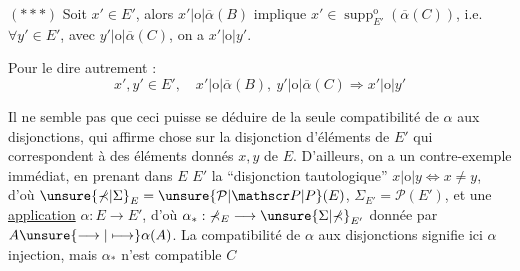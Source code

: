 $(***)$ Soit $x'\in E'$, alors $x'|\mathrm{o}|\overline\alpha(B)$ implique $x'\in\operatorname{supp}^{\mathrm{o}}_{E'}(\overline\alpha(C))$, i.e. $\forall y'\in E'$, avec $y'|\mathrm{o}|\overline\alpha(C)$, on a $x'|\mathrm{o}|y'$.

Pour le dire autrement :
\[
x',y'\in E',\quad x'|\mathrm{o}|\overline\alpha(B),\ y'|\mathrm{o}|\overline\alpha(C)\Longrightarrow x'|\mathrm{o}|y'
\]

Il ne semble pas que ceci puisse se déduire de la seule compatibilité de $\alpha$ aux disjonctions, qui affirme  chose sur la disjonction  d'éléments  de $E'$ qui  correspondent à des éléments donnés $x,y$ de $E$.
D'ailleurs, on a un contre-exemple immédiat, en prenant dans $E$  $E'$ la ``disjonction tautologique'' $x|\mathrm{o}|y\Longleftrightarrow x\ne y$, d'où
$\unsure{\mathbb\Sigma|\Sigma}_E=\unsure{\mathcal P|\mathscr P|P}(E)$, $\mathbb\Sigma_{E'}=\mathcal P(E')$, et une \uline{application} $\alpha:E\longrightarrow E'$, d'où $\alpha_*:\mathbb\Sigma_E\longrightarrow\unsure{\Sigma|\mathbb\Sigma}_{E'}$ donnée par \deleted{$\unsure{\alpha}$} $A\unsure{\longrightarrow|\longmapsto}\alpha(A)$.
La compatibilité de $\alpha$ aux disjonctions signifie ici $\alpha$ injection, mais $\alpha_*$ n'est compatible  $C$
